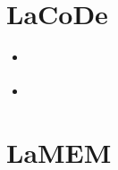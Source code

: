 


\section{LaCoDe} 

\begin{small}
\begin{itemize}
\item[\twothousandnineteen] \textcite{demh19}
\item[\twothousandtwentytwo] \textcite{vacd22}
\end{itemize}
\end{small}


\section{LaMEM}

